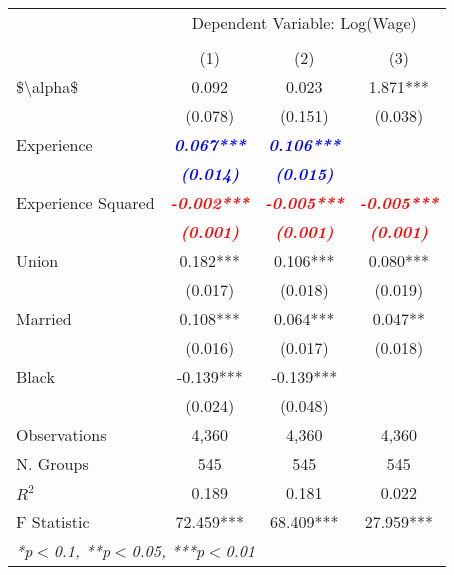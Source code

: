 
\begin{table}[!ht]
  \centering
\begin{tabular}{lccc}
  \toprule
  \toprule
  & \multicolumn{3}{c}{Dependent Variable: Log(Wage)} \\
  \cmidrule(lr){2-4} \\
   & (1) & (2) & (3)\\
  \midrule
  \$\textbackslash alpha\$ & 0.092 & 0.023 & 1.871*** \\
   & (0.078) & (0.151) & (0.038) \\
  Experience & \textbf{\textit{\textcolor{blue}{ 0.067***}}} & \textbf{\textit{\textcolor{blue}{ 0.106***}}} &  \\
   & \textbf{\textit{\textcolor{blue}{(0.014)}}} & \textbf{\textit{\textcolor{blue}{(0.015)}}} &  \\
  Experience Squared & \textbf{\textit{\textcolor{red}{-0.002***}}} & \textbf{\textit{\textcolor{red}{-0.005***}}} & \textbf{\textit{\textcolor{red}{-0.005***}}} \\
   & \textbf{\textit{\textcolor{red}{(0.001)}}} & \textbf{\textit{\textcolor{red}{(0.001)}}} & \textbf{\textit{\textcolor{red}{(0.001)}}} \\
  Union & 0.182*** & 0.106*** & 0.080*** \\
   & (0.017) & (0.018) & (0.019) \\
  Married & 0.108*** & 0.064*** & 0.047** \\
   & (0.016) & (0.017) & (0.018) \\
  Black & -0.139*** & -0.139*** &  \\
   & (0.024) & (0.048) &  \\
  \midrule
  Observations & 4,360 & 4,360 & 4,360 \\
  N. Groups & 545 & 545 & 545 \\
  $R^2$ & 0.189 & 0.181 & 0.022 \\
  F Statistic & 72.459*** & 68.409*** & 27.959*** \\
  \bottomrule
  \multicolumn{4}{l}{{\small \textit{*p$<$0.1, **p$<$0.05, ***p$<$0.01}}}\\
\end{tabular}
\end{table}
